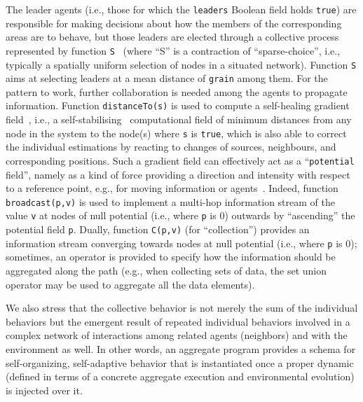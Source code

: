 \documentclass[jsan,article,accept,moreauthors,pdftex]{Definitions/mdpi}
\begin{document}
\begin{paracol}{2}
\switchcolumn

%
The leader agents (i.e., those for which the \lstinline|leaders| Boolean field holds \lstinline|true|)
 are responsible for making decisions
 about how the members of the corresponding areas
 are to behave,
 but those leaders are elected through a collective process
 represented by function \lstinline|S|~\cite{DBLP:conf/saso/MoBD18} (where ``S'' is a contraction of ``sparse-choice'', i.e., typically a spatially uniform selection of nodes in a situated network).
%
Function \lstinline|S| aims at selecting leaders at a mean distance of \lstinline|grain| among them.
%
For the pattern to work, further collaboration is needed among the agents to propagate information.
%
{Function \lstinline|distanceTo(s)|
 is used to compute a self-healing {gradient field}~\cite{audrito2017saso},
 i.e., a self-stabilising~\cite{DBLP:journals/tomacs/ViroliABDP18} computational field 
 of minimum distances from any node in the system
 to the node(s) where \lstinline|s| is \lstinline|true|,
 which is also able to correct the individual estimations
 by reacting to changes of sources, neighbours, and corresponding positions.
%
Such a gradient field can effectively act as a ``\lstinline|potential| field'', namely as a kind of force providing 
a direction and intensity with respect to a reference point,
e.g., for moving information or agents~\cite{DBLP:conf/saso/WolfH07}.
%
Indeed, f}unction \lstinline|broadcast(p,v)| is used to implement a multi-hop information stream
 of  {the value \lstinline|v| at nodes of null potential (i.e., where \lstinline|p| is $0$)
 outwards by ``ascending'' the potential field \lstinline|p|}.
%
Dually, function \lstinline|C(p,v)| (for ``collection'') provides an information stream
 converging towards nodes  {at null potential (i.e., where \lstinline|p| is $0$)}; sometimes, an operator is provided to specify how the information should be aggregated along the path (e.g., when collecting sets of data, the set union operator may be used to aggregate all the data elements).
%

We also stress that the collective behavior 
 is not merely the sum of the individual behaviors
 but the emergent result of 
 repeated individual behaviors involved
 in a complex network of interactions 
 among related agents (neighbors) 
 and with the environment as well.
%
In other words, an aggregate program 
 provides a schema for self-organizing, self-adaptive behavior
 that is instantiated once a proper dynamic 
 (defined in terms of a concrete aggregate execution and environmental evolution)
 is injected over it.


\end{paracol}
\end{document}
